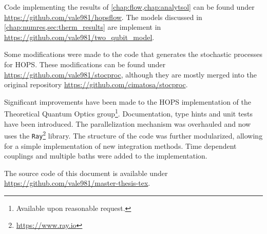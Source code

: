 Code implementing the results of \cref{chap:flow,chap:analytsol} can
be found under \url{https://github.com/vale981/hopsflow}. The models
discussed in \cref{chap:numres,sec:therm_results} are implement in
\url{https://github.com/vale981/two_qubit_model}.

Some modifications were made to the code that generates the stochastic
processes for HOPS. These modifications can be found under
\url{https://github.com/vale981/stocproc}, although they are mostly
merged into the original repository
\url{https://github.com/cimatosa/stocproc}.

Significant improvements have been made to the HOPS implementation of
the Theoretical Quantum Optics group\footnote{Available upon
  reasonable request.}. Documentation, type hints and unit tests have
been introduced. The parallelization mechanism was overhauled and now
uses the \texttt{Ray}\footnote{\url{https://www.ray.io}} library. The
structure of the code was further modularized, allowing for a simple
implementation of new integration methods. Time dependent couplings
and multiple baths were added to the implementation.

The source code of this document is available under
\url{https://github.com/vale981/master-thesis-tex}.



